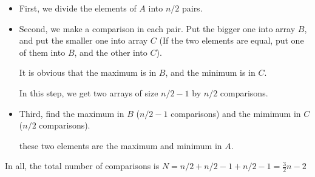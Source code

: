 \begin{itemize}
	\item First, we divide the elements of $A$ into $n/2$ pairs.
	\item Second, we make a comparison in each pair. Put the bigger one into array $B$, and put the smaller one into array $C$ 
	(If the two elements are equal, put one of them into $B$, and the other into $C$).

	It is obvious that the maximum is in $B$, and the minimum is in $C$.
	
	In this step, we get two arrays of size $n/2 - 1$ by $n/2$ comparisons.	
	\item Third, find the maximum in $B$ ($n/2 - 1$ comparisons) and the mimimum in $C$ ($n/2$ comparisons).
	
	these two elements are the maximum and minimum in $A$.
\end{itemize}

In all, the total number of comparisons is $N = n/2 + n / 2 - 1 + n / 2 - 1 = \frac{3}{2}n - 2$
